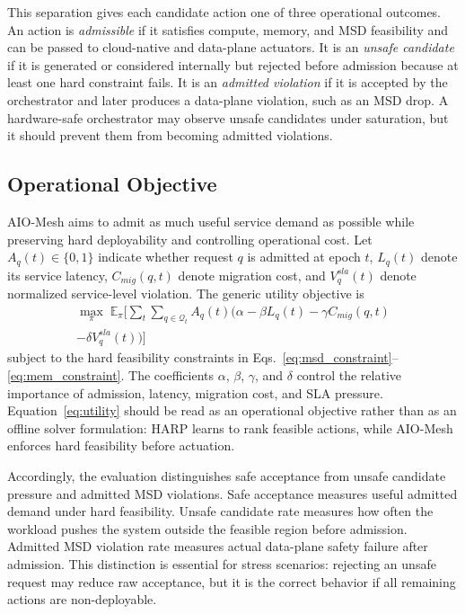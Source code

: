 \documentclass[final,5p]{elsarticle}
\begin{document}
This separation gives each candidate action one of three operational outcomes. An action is \textit{admissible} if it satisfies compute, memory, and MSD feasibility and can be passed to cloud-native and data-plane actuators. It is an \textit{unsafe candidate} if it is generated or considered internally but rejected before admission because at least one hard constraint fails. It is an \textit{admitted violation} if it is accepted by the orchestrator and later produces a data-plane violation, such as an MSD drop. A hardware-safe orchestrator may observe unsafe candidates under saturation, but it should prevent them from becoming admitted violations.

\subsection{Operational Objective}
\label{subsec:objective_metrics}

AIO-Mesh aims to admit as much useful service demand as possible while preserving hard deployability and controlling operational cost. Let \(A_q(t)\in\{0,1\}\) indicate whether request \(q\) is admitted at epoch \(t\), \(L_q(t)\) denote its service latency, \(C_{mig}(q,t)\) denote migration cost, and \(V_q^{sla}(t)\) denote normalized service-level violation. The generic utility objective is
\begin{equation}
\begin{aligned}
\max_{\pi} \;
\mathbb{E}_{\pi} \Bigg[
\sum_{t} \sum_{q \in \mathcal{Q}_t}
A_q(t) \Big(
\alpha - \beta L_q(t) - \gamma C_{mig}(q,t) \\
- \delta V_q^{sla}(t)
\Big)
\Bigg]
\end{aligned}
\label{eq:utility}
\end{equation}
subject to the hard feasibility constraints in
Eqs.~\eqref{eq:msd_constraint}--\eqref{eq:mem_constraint}. The coefficients \(\alpha\), \(\beta\), \(\gamma\), and \(\delta\) control the relative importance of admission, latency, migration cost, and SLA pressure. Equation~\eqref{eq:utility} should be read as an operational objective rather than as an offline solver formulation: HARP learns to rank feasible actions, while AIO-Mesh enforces hard feasibility before actuation.

Accordingly, the evaluation distinguishes safe acceptance from unsafe candidate pressure and admitted MSD violations. Safe acceptance measures useful admitted demand under hard feasibility. Unsafe candidate rate measures how often the workload pushes the system outside the feasible region before admission. Admitted MSD violation rate measures actual data-plane safety failure after admission. This distinction is essential for stress scenarios: rejecting an unsafe request may reduce raw acceptance, but it is the correct behavior if all remaining actions are non-deployable.
\end{document}
